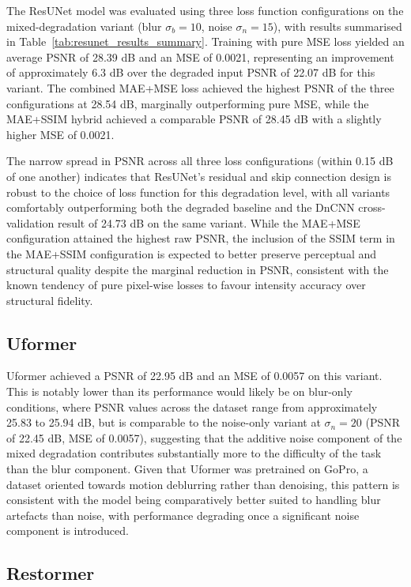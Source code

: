 \documentclass[conference]{IEEEtran}
\begin{document}
The ResUNet model was evaluated using three loss function configurations
on the mixed-degradation variant (blur $\sigma_b = 10$, noise $\sigma_n =
15$), with results summarised in Table~\ref{tab:resunet_results_summary}.
Training with pure MSE loss yielded an average PSNR of 28.39 dB and an
MSE of 0.0021, representing an improvement of approximately 6.3 dB over
the degraded input PSNR of 22.07 dB for this variant. The combined
MAE+MSE loss achieved the highest PSNR of the three configurations at
28.54 dB, marginally outperforming pure MSE, while the MAE+SSIM hybrid
achieved a comparable PSNR of 28.45 dB with a slightly higher MSE of
0.0021.

The narrow spread in PSNR across all three loss configurations (within
0.15 dB of one another) indicates that ResUNet's residual and skip
connection design is robust to the choice of loss function for this
degradation level, with all variants comfortably outperforming both the
degraded baseline and the DnCNN cross-validation result of 24.73 dB on
the same variant. While the MAE+MSE configuration attained the highest
raw PSNR, the inclusion of the SSIM term in the MAE+SSIM configuration is
expected to better preserve perceptual and structural quality despite the
marginal reduction in PSNR, consistent with the known tendency of pure
pixel-wise losses to favour intensity accuracy over structural fidelity.

\subsection{Uformer}

Uformer achieved a PSNR of 22.95 dB and an MSE of 0.0057 on this variant.
This is notably lower than its performance would likely be on blur-only
conditions, where PSNR values across the dataset range from approximately
25.83 to 25.94 dB, but is comparable to the noise-only variant at
$\sigma_n = 20$ (PSNR of 22.45 dB, MSE of 0.0057), suggesting that the
additive noise component of the mixed degradation contributes
substantially more to the difficulty of the task than the blur component.
Given that Uformer was pretrained on GoPro, a dataset oriented towards
motion deblurring rather than denoising, this pattern is consistent with
the model being comparatively better suited to handling blur artefacts
than noise, with performance degrading once a significant noise component
is introduced.

\subsection{Restormer}
\end{document}
